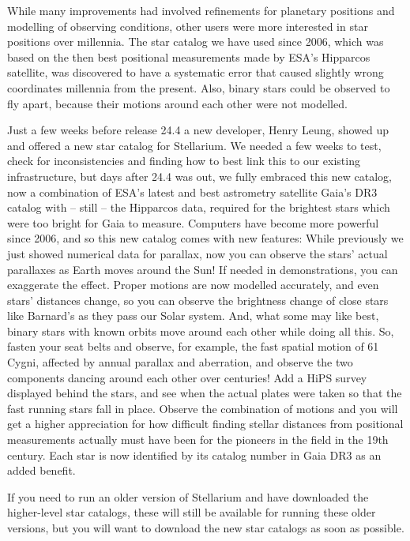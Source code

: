 While many improvements had involved  refinements for planetary positions and modelling of observing conditions, 
other users were more interested in star positions over millennia. 
The star catalog we have used since 2006, which was based on the 
then best positional measurements made by ESA's Hipparcos satellite,  was discovered to have 
a systematic error that caused slightly wrong coordinates millennia from the present. 
Also, binary stars could be observed to fly apart, because their motions around each other were not modelled. 

Just a few weeks before release 24.4 a new developer, Henry Leung, showed up and offered a new star catalog for Stellarium. 
We needed a few weeks to test, check for inconsistencies and finding how to best link this to our existing infrastructure, 
but days after 24.4 was out, we fully embraced this new catalog, now a combination of ESA's latest 
and best astrometry satellite Gaia's DR3 catalog with -- still -- the Hipparcos data, 
required for the brightest stars which were too bright for Gaia to measure. 
Computers have become more powerful since 2006, and so this new catalog comes with new features: While previously 
we just showed numerical data for parallax, now you can observe the stars' actual parallaxes as Earth moves around the Sun! 
If needed in demonstrations, you can exaggerate the effect.
Proper motions are now modelled accurately, and even stars' distances change, so you can observe the brightness change of 
close stars like Barnard's as they pass our Solar system. And, what some may like best, 
binary stars with known orbits move around each other while doing all this. 
So, fasten your seat belts and observe, for example, the fast spatial motion of 61 Cygni, affected by annual parallax and aberration, 
and observe the two components dancing around each other over centuries! Add a HiPS survey displayed behind the stars, 
and see when the actual plates were taken so that the fast running stars fall in place. 
Observe the combination of motions and you will get a higher appreciation for how difficult 
finding stellar distances from positional measurements actually must have been for the pioneers in the field in the 19th century.
Each star is now identified by its catalog number in Gaia DR3 as an added benefit. 

If you need to run an older version of Stellarium and have downloaded the higher-level star catalogs, 
these will still be available for running these older versions, but you will want to download the new star catalogs as soon as possible. 


